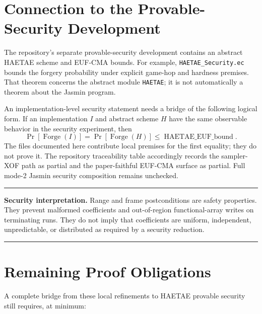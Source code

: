 \documentclass[11pt]{article}
\theoremstyle{definition}
\theoremstyle{plain}
\theoremstyle{remark}
\newcommand{\code}[1]{\nolinkurl{#1}}
\newenvironment{boundarybox}
  {\begin{center}\begin{minipage}{0.94\linewidth}\color{artifactred}\hrule\vspace{0.6em}\color{black}}
  {\vspace{0.6em}\color{artifactred}\hrule\end{minipage}\end{center}}
\begin{document}
\section{Connection to the Provable-Security Development}

The repository's separate provable-security development contains an abstract
HAETAE scheme and EUF-CMA bounds.  For example,
\code{HAETAE_Security.ec} bounds the forgery probability under explicit
game-hop and hardness premises.  That theorem concerns the abstract module
\code{HAETAE}; it is not automatically a theorem about the Jasmin program.

An implementation-level security statement needs a bridge of the following
logical form.  If an implementation $I$ and abstract scheme $H$ have the same
observable behavior in the security experiment, then
\[
  \Pr[\operatorname{Forge}(I)]
  =\Pr[\operatorname{Forge}(H)]
  \le \operatorname{HAETAE\_EUF\_bound}.
\]
The files documented here contribute local premises for the first equality;
they do not prove it.  The repository traceability table accordingly records
the sampler-XOF path as partial and the paper-faithful EUF-CMA surface as
partial.  Full mode-2 Jasmin security composition remains unchecked.

\begin{boundarybox}
\textbf{Security interpretation.}
Range and frame postconditions are safety properties.  They prevent malformed
coefficients and out-of-region functional-array writes on terminating runs.
They do not imply that coefficients are uniform, independent, unpredictable,
or distributed as required by a security reduction.
\end{boundarybox}

\section{Remaining Proof Obligations}

A complete bridge from these local refinements to HAETAE provable security
still requires, at minimum:
\end{document}
